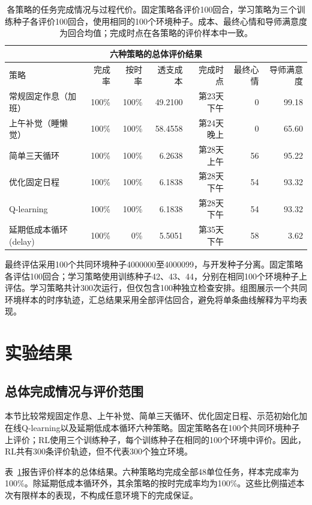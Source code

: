\documentclass[journal]{IEEEtran}
\begin{document}
\begin{table}[t]
\centering
\small
\setlength{\tabcolsep}{3pt}
\begin{tabular*}{\textwidth}{@{\extracolsep{\fill}}lrrrrrr@{}}
\multicolumn{7}{c}{\textsc{六种策略的总体评价结果}} \\
\hline\hline
策略 & 完成率 & 按时率 & 透支成本 & 完成时点
& 最终心情 & 导师满意度\\
\hline
常规固定作息（加班）
& 100\% & 100\% & 49.2100 & 第23天下午 & 0 & 99.18\\
上午补觉（睡懒觉）
& 100\% & 100\% & 58.4558 & 第24天晚上 & 0 & 65.60\\
简单三天循环
& 100\% & 100\% & 6.2638 & 第28天上午 & 56 & 95.22\\
优化固定日程
& 100\% & 100\% & 6.1838 & 第28天下午 & 54 & 93.32\\
Q-learning
& 100\% & 100\% & 6.1838 & 第28天下午 & 54 & 93.32\\
延期低成本循环(delay)
& 100\% & 0\% & 5.5051 & 第35天下午 & 58 & 3.62\\
\hline\hline
\end{tabular*}
\caption{各策略的任务完成情况与过程代价。固定策略各评价100回合，学习策略为三个训练种子各评价100回合，使用相同的100个环境种子。成本、最终心情和导师满意度为回合均值；完成时点在各策略的评价样本中一致。}
\label{tab:main}
\end{table}

最终评估采用100个共同环境种子4000000至4000099，与开发种子分离。固定策略各评估100回合；学习策略使用训练种子42、43、44，分别在相同100个环境种子上评估。学习策略共计300次运行，但仅包含100种独立检查安排。组图展示一个共同环境样本的时序轨迹，汇总结果采用全部评估回合，避免将单条曲线解释为平均表现。

\section{实验结果}
\subsection{总体完成情况与评价范围}

本节比较常规固定作息、上午补觉、简单三天循环、优化固定日程、示范初始化加在线Q-learning以及延期低成本循环六种策略。固定策略各在100个共同环境种子上评价；RL使用三个训练种子，每个训练种子在相同的100个环境中评价。因此，RL共有300条评价轨迹，但不代表300个独立环境。

表~\ref{tab:main}报告评价样本的总体结果。六种策略均完成全部48单位任务，样本完成率为100\%。除延期低成本循环外，其余策略的按时完成率均为100\%。这些比例描述本次有限样本的表现，不构成任意环境下的完成保证。
\end{document}

